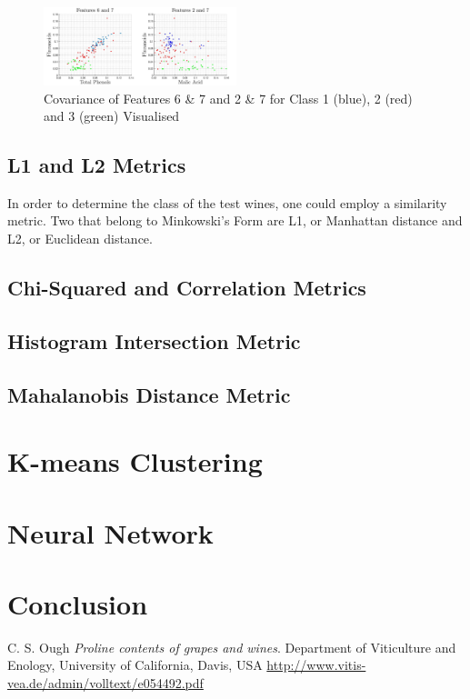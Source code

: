 \documentclass[10pt,twocolumn,letterpaper]{article}
\begin{document}
\begin{figure}[H]
\centering
\includegraphics[width=0.5\textwidth]{../results/Q1_covIdv}
\caption{Covariance of Features 6 \& 7 and 2 \& 7  for Class 1 (blue), 2 (red) and 3 (green) Visualised \label{fig:covIdv}}
\end{figure}

\subsection{L1 and L2 Metrics}

In order to determine the class of the test wines, one could employ a similarity metric. Two that belong to Minkowski's Form are L1, or Manhattan distance and L2, or Euclidean distance.

\subsection{Chi-Squared and Correlation Metrics}

\subsection{Histogram Intersection Metric}

\subsection{Mahalanobis Distance Metric}

\section{K-means Clustering}

\section{Neural Network}

\section{Conclusion}

\begin{thebibliography}{9}
C. S. Ough
\textit{Proline contents of grapes and wines}. 
Department of Viticulture and Enology, University of California, Davis, USA
\url{http://www.vitis-vea.de/admin/volltext/e054492.pdf}


\end{thebibliography}
\end{document}
